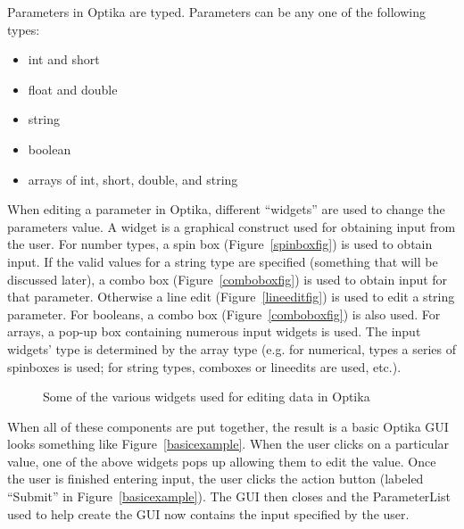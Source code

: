 Parameters in Optika are typed. Parameters can be any one of the following types:
	\begin{itemize}
		\item int and short
		\item float and double
		\item string
		\item boolean
		\item arrays of int, short, double, and string
	\end{itemize}
When editing a parameter in Optika, different ``widgets'' are used to change the parameters value. A widget is 
a graphical construct used for obtaining input from the user. For number types, a spin box (Figure~\ref{spinboxfig}) is used to obtain input. 
If the valid values for a string type are specified (something that will be discussed later), a combo box (Figure~\ref{comboboxfig}) is used to obtain
input for that parameter.
Otherwise a line edit (Figure~\ref{lineeditfig}) is used to edit a string parameter. For booleans, a combo box (Figure~\ref{comboboxfig}) 
is also used. For arrays, a pop-up box containing numerous input widgets is used. The input widgets' type is determined by the
array type (e.g. for numerical, types a series of spinboxes is used; for string types, comboxes or lineedits are used, etc.). 

\begin{figure}
	\centering
	\caption{Some of the various widgets used for editing data in Optika~\cite{QtGallery}}
	\label{editingWidgets}
\end{figure}

When all of these components are put together, the result is a basic Optika GUI looks something like Figure~\ref{basicexample}.
When the user clicks on a particular value, one of the above widgets pops up allowing them to edit the value.
Once the user is finished entering input, the user clicks the action button (labeled ``Submit'' in Figure~\ref{basicexample}).
The GUI then closes and the ParameterList used to help create the GUI now contains the input specified by the user.

